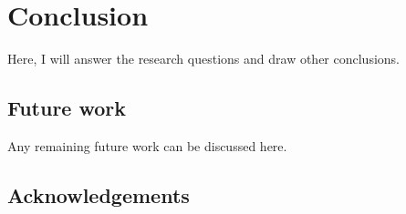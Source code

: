 \chapter{Conclusion}
\label{chapter:conclusion}
Here, I will answer the research questions and draw  other conclusions.

\section{Future work}
\label{section:futurework}
Any remaining future work can be discussed here.

\section{Acknowledgements}
\label{section:acknowledgements}
